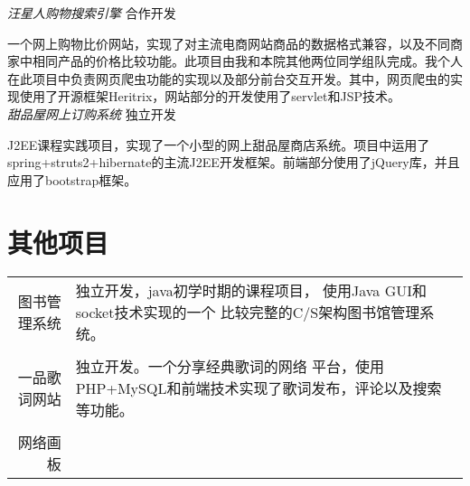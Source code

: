 \documentclass[10pt]{article} %
\begin{document}
{\begin{minipage}[t]{0.5\textwidth}

{\large \textit{汪星人购物搜索引擎}} \hfill  \hfill {\textsc{合作开发}\\}

\normalsize{一个网上购物比价网站，实现了对主流电商网站商品的数据格式兼容，以及不同商家中相同产品的价格比较功能。此项目由我和本院其他两位同学组队完成。我个人在此项目中负责网页爬虫功能的实现以及部分前台交互开发。其中，网页爬虫的实现使用了开源框架Heritrix，网站部分的开发使用了servlet和JSP技术。}\\


{\large \textit{甜品屋网上订购系统}} \hfill  \hfill {\textsc{独立开发}\\}

\normalsize{J2EE课程实践项目，实现了一个小型的网上甜品屋商店系统。项目中运用了spring+struts2+hibernate的主流J2EE开发框架。前端部分使用了jQuery库，并且应用了bootstrap框架。}\\



\section{其他项目} 

\begin{tabular}{rl}
     图书管理系统 & 
     \begin{minipage}[t]{0.72\textwidth}
     独立开发，java初学时期的课程项目，
     使用Java GUI和socket技术实现的一个
     比较完整的C/S架构图书馆管理系统。
     \end{minipage}
     \\
	\\
     一品歌词网站 & 
     \begin{minipage}[t]{0.72\textwidth}
     独立开发。一个分享经典歌词的网络
     平台，使用PHP+MySQL和前端技术实现了歌词发布，评论以及搜索
     等功能。
     \end{minipage}
	\\
     \\
     网络画板     & 
     \begin{minipage}[t]{0.72\textwidth}


\end{minipage}
\end{tabular}
\end{minipage}}
\end{document}
